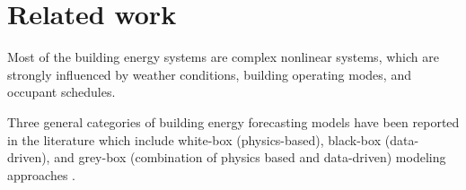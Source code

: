\documentclass[10pt, conference, compsocconf]{IEEEtran}
\begin{document}









\section{Related work}

Most of the building energy systems are complex nonlinear systems, which are strongly influenced by weather conditions, building operating modes, and occupant schedules.

Three general categories of building energy forecasting models have been reported in the literature which include white-box (physics-based), black-box (data-driven), and grey-box (combination of physics based and data-driven) modeling approaches \cite{li2014review}.
\end{document}
